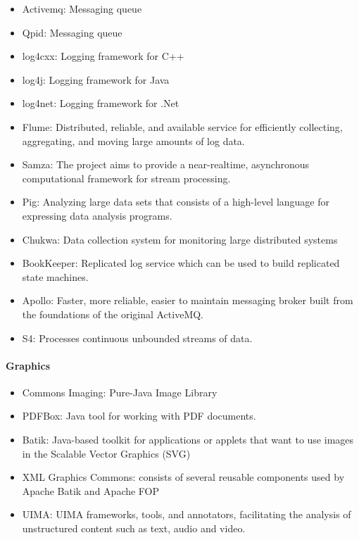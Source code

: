 \documentclass[natbib]{svjour3}
\providecommand{\tightlist}{%
  \setlength{\itemsep}{0pt}\setlength{\parskip}{0pt}}
\let\oldparagraph\paragraph
\renewcommand{\paragraph}[1]{\oldparagraph{#1}\mbox{}}
\begin{document}
\begin{itemize}
\tightlist
\item
  Activemq: Messaging queue
\item
  Qpid: Messaging queue
\item
  log4cxx: Logging framework for C++
\item
  log4j: Logging framework for Java
\item
  log4net: Logging framework for .Net
\item
  Flume: Distributed, reliable, and available service for efficiently
  collecting, aggregating, and moving large amounts of log data.
\item
  Samza: The project aims to provide a near-realtime, asynchronous
  computational framework for stream processing.
\item
  Pig: Analyzing large data sets that consists of a high-level language
  for expressing data analysis programs.
\item
  Chukwa: Data collection system for monitoring large distributed
  systems
\item
  BookKeeper: Replicated log service which can be used to build
  replicated state machines.
\item
  Apollo: Faster, more reliable, easier to maintain messaging broker
  built from the foundations of the original ActiveMQ.
\item
  S4: Processes continuous unbounded streams of data.
\end{itemize}

\paragraph{Graphics}\label{graphics}

\begin{itemize}
\tightlist
\item
  Commons Imaging: Pure-Java Image Library
\item
  PDFBox: Java tool for working with PDF documents.
\item
  Batik: Java-based toolkit for applications or applets that want to use
  images in the Scalable Vector Graphics (SVG)
\item
  XML Graphics Commons: consists of several reusable components used by
  Apache Batik and Apache FOP
\item
  UIMA: UIMA frameworks, tools, and annotators, facilitating the
  analysis of unstructured content such as text, audio and video.
\end{itemize}
\end{document}
